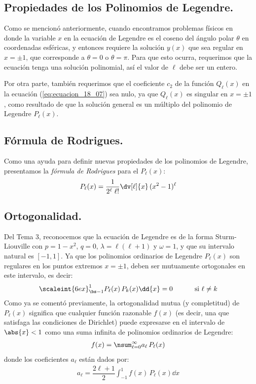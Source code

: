 \subsection{Propiedades de los Polinomios de Legendre.}

Como se mencionó anteriormente, cuando encontramos problemas físicos en donde la variable $x$ en la ecuación de Legendre es el coseno del ángulo polar $\theta$ en coordenadas esféricas, y entonces requiere la solución $y(x)$ que sea regular en $x = \pm 1$, que corresponde a $\theta = 0$ o $\theta = \pi$. Para que esto ocurra, requerimos que la ecuación tenga una solución polinomial, así el valor de $\ell$ debe ser un entero.
\par
Por otra parte, también requerimos que el coeficiente $c_{2}$ de la función $Q_{\ell}(x)$ en la ecuación (\ref{eq:ecuacion_18_07}) sea nulo, ya que $Q_{\ell}(x)$ es singular en $x = \pm 1$, como resultado de que la solución general es un múltiplo del polinomio de Legendre $P_{\ell}(x)$.

\subsection{Fórmula de Rodrigues.}

Como una ayuda para definir nuevas propiedades de los polinomios de Legendre, presentamos la \emph{fórmula de Rodrigues} para el $P_{\ell} (x)$:
\begin{align}
P_{\ell} (x) = \dfrac{1}{2^{\ell} \; \ell !} \dv[\ell]{x} \, (x^{2} - 1)^{\ell}
\label{eq:ecuacion_18_09}
\end{align}

\subsection{Ortogonalidad.}

Del Tema 3, reconocemos que la ecuación de Legendre es de la forma Sturm-Liouville con $p = 1 - x^{2}$, $q = 0$, $\lambda = \ell (\ell + 1)$ y $\omega = 1$, y que su intervalo natural es $[-1, 1]$. Ya que los polinomios ordinarios de Legendre $P_{\ell} (x)$ son regulares en los puntos extremos $x = \pm 1$, deben ser mutuamente ortogonales en este intervalo, es decir:
\begin{align}
\scaleint{6ex}_{\bs -1}^{1} P_{\ell}(x) \, P_{k}(x) \dd{x} = 0 \hspace{1cm} \mbox{ si $\ell \neq k$}
\label{eq:ecuacion_18_12}
\end{align}
Como ya se comentó previamente, la ortogonalidad mutua (y completitud) de $P_{\ell} (x)$ significa que cualquier función razonable $f(x)$ (es decir, una que satisfaga las condiciones de Dirichlet) puede expresarse en el intervalo de $\abs{x} < 1$ como una suma infinita de polinomios ordinarios de Legendre:
\begin{align}
f(x) = \nsum_{\ell = 0}^{\infty} a_{\ell} \, P_{\ell} (x)
\label{eq:ecuacion_013}
\end{align}
donde los coeficientes $a_{\ell}$ están dados por:
\begin{align}
a_{\ell} = \dfrac{2 \ell + 1}{2} \int_{-1}^{1} f(x) \, P_{\ell} (x) \dd{x}
\label{eq:ecuacion_18_14}
\end{align}

